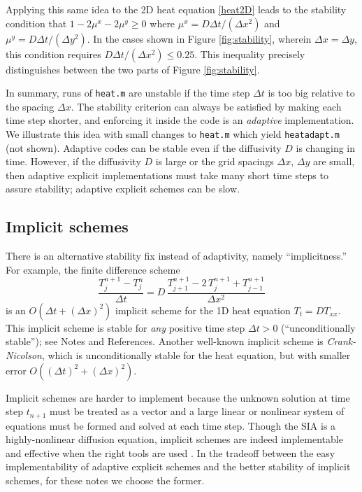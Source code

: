 \documentclass[letterpaper,final,12pt,reqno]{amsart}
\begin{document}
Applying this same idea to the 2D heat equation \eqref{heat2D} leads to the stability condition that $1-2\mu^x-2\mu^y \ge 0$ where $\mu^x = D \Delta t / (\Delta x^2)$ and $\mu^y = D \Delta t / (\Delta y^2)$.  In the cases shown in Figure \ref{fig:stability}, wherein $\Delta x=\Delta y$, this condition requires $D \Delta t /(\Delta x^2) \le 0.25$.  This inequality precisely distinguishes between the two parts of Figure \ref{fig:stability}.

In summary, runs of \texttt{heat.m} are unstable if the time step $\Delta t$ is too big relative to the spacing $\Delta x$.  The stability criterion can always be satisfied by making each time step shorter, and enforcing it inside the code is an \emph{adaptive} implementation.  We illustrate this idea with small changes to \texttt{heat.m} which yield \texttt{heatadapt.m} (not shown).  Adaptive codes can be stable even if the diffusivity $D$ is changing in time.  However, if the diffusivity $D$ is large or the grid spacings $\Delta x$, $\Delta y$ are small, then adaptive explicit implementations must take many short time steps to assure stability; adaptive explicit schemes can be slow.

\subsection*{Implicit schemes}  There is an alternative stability fix instead of adaptivity, namely ``implicitness.''  For example, the finite difference scheme
\begin{equation}
  \frac{T_j^{n+1} - T_j^n}{\Delta t} = D\,\frac{T_{j+1}^{n+1} - 2\, T_j^{n+1} + T_{j-1}^{n+1}}{\Delta x^2} \label{implicit1D}
\end{equation}
is an $O(\Delta t + (\Delta x)^2)$ implicit scheme for the 1D heat equation $T_t = D T_{xx}$.  This implicit scheme is stable for \emph{any} positive time step $\Delta t>0$ (``unconditionally stable''); see Notes and References.  Another well-known implicit scheme is \emph{Crank-Nicolson}, which is unconditionally stable for the heat equation, but with smaller error $O((\Delta t)^2 +(\Delta x)^2)$.

Implicit schemes are harder to implement because the unknown solution at time step $t_{n+1}$ must be treated as a vector and a large linear or nonlinear system of equations must be formed and solved at each time step.  Though the SIA is a highly-nonlinear diffusion equation, implicit schemes are indeed implementable and effective when the right tools are used \cite{Bueler2016}.  In the tradeoff between the easy implementability of adaptive explicit schemes and the better stability of implicit schemes, for these notes we choose the former.
\end{document}
